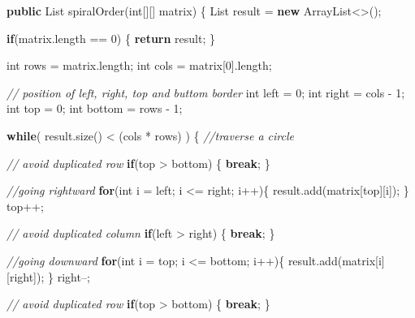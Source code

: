 \documentclass[]{book}
\newenvironment{Shaded}{\begin{snugshade}}{\end{snugshade}}
\newcommand{\BuiltInTok}[1]{#1}
\newcommand{\CommentTok}[1]{\textcolor[rgb]{0.56,0.35,0.01}{\textit{#1}}}
\newcommand{\DataTypeTok}[1]{\textcolor[rgb]{0.13,0.29,0.53}{#1}}
\newcommand{\DecValTok}[1]{\textcolor[rgb]{0.00,0.00,0.81}{#1}}
\newcommand{\FunctionTok}[1]{\textcolor[rgb]{0.00,0.00,0.00}{#1}}
\newcommand{\KeywordTok}[1]{\textcolor[rgb]{0.13,0.29,0.53}{\textbf{#1}}}
\newcommand{\NormalTok}[1]{#1}
\begin{document}
\begin{Shaded}
\begin{Highlighting}[]
\KeywordTok{public} \BuiltInTok{List} \FunctionTok{spiralOrder}\NormalTok{(}\DataTypeTok{int}\NormalTok{[][] matrix) \{}
    \BuiltInTok{List}\NormalTok{ result = }\KeywordTok{new} \BuiltInTok{ArrayList}\NormalTok{<>();}

    \KeywordTok{if}\NormalTok{(matrix.}\FunctionTok{length}\NormalTok{ == }\DecValTok{0}\NormalTok{) \{}
        \KeywordTok{return}\NormalTok{ result;}
\NormalTok{    \}}

    \DataTypeTok{int}\NormalTok{ rows = matrix.}\FunctionTok{length}\NormalTok{;}
    \DataTypeTok{int}\NormalTok{ cols = matrix[}\DecValTok{0}\NormalTok{].}\FunctionTok{length}\NormalTok{;}

    \CommentTok{// position of left, right, top and buttom border}
    \DataTypeTok{int}\NormalTok{ left = }\DecValTok{0}\NormalTok{;}
    \DataTypeTok{int}\NormalTok{ right = cols - }\DecValTok{1}\NormalTok{;}
    \DataTypeTok{int}\NormalTok{ top = }\DecValTok{0}\NormalTok{;}
    \DataTypeTok{int}\NormalTok{ bottom = rows - }\DecValTok{1}\NormalTok{;}

    \KeywordTok{while}\NormalTok{( result.}\FunctionTok{size}\NormalTok{() < (cols * rows) ) \{}
        \CommentTok{//traverse a circle}

        \CommentTok{// avoid duplicated row}
        \KeywordTok{if}\NormalTok{(top > bottom) \{}
            \KeywordTok{break}\NormalTok{;}
\NormalTok{        \}}

        \CommentTok{//going rightward}
        \KeywordTok{for}\NormalTok{(}\DataTypeTok{int}\NormalTok{ i = left; i <= right; i++)\{}
\NormalTok{            result.}\FunctionTok{add}\NormalTok{(matrix[top][i]);}
\NormalTok{        \}}
\NormalTok{        top++;}

        \CommentTok{// avoid duplicated column}
        \KeywordTok{if}\NormalTok{(left > right) \{}
            \KeywordTok{break}\NormalTok{;}
\NormalTok{        \}}

        \CommentTok{//going downward}
        \KeywordTok{for}\NormalTok{(}\DataTypeTok{int}\NormalTok{ i = top; i <= bottom; i++)\{}
\NormalTok{            result.}\FunctionTok{add}\NormalTok{(matrix[i][right]);}
\NormalTok{        \}}
\NormalTok{        right--;}

        \CommentTok{// avoid duplicated row}
        \KeywordTok{if}\NormalTok{(top > bottom) \{}
            \KeywordTok{break}\NormalTok{;}
\NormalTok{        \}}


\end{Highlighting}
\end{Shaded}
\end{document}

